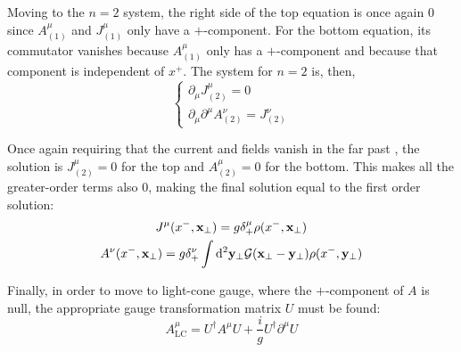 Moving to the $n=2$ system, the right side of the top equation is once again $0$ since $A_{(1)}^\mu$ and $J_{(1)}^{\mu}$ only have a $+$-component. For the bottom equation, its commutator vanishes because $A_{(1)}^\mu$ only has a $+$-component and because that component is independent of $x^+$. The system for $n=2$ is, then,
\begin{equation}
	\begin{cases}
	\partial_\mu J_{(2)}^\mu = 0  \\
	\partial_\mu \partial^\mu A_{(2)}^\nu = J_{(2)}^\nu
	\end{cases}
\end{equation}

Once again requiring that the current and fields vanish in the far past
, the solution is $J_{(2)}^\mu = 0$ for the top and $A_{(2)}^\mu =0$ for the bottom. This makes all the greater-order terms also $0$, making the final solution equal to the first order solution:
\begin{subequations}
\begin{gather}
	J^\mu(x^-,\mathbf{x}_\perp) = g \delta^{\mu}_+ \rho(x^-,\mathbf{x}_\perp) \\
	A^\nu(x^-,\mathbf{x}_\perp) =  g \delta^{\nu}_+  \int \mathop{}\!\mathrm{d}^2 \mathbf{y}_\perp \mathcal{G}(\mathbf{x_\perp} - \mathbf{y_\perp}) \rho(x^-,\mathbf{y}_\perp)
\end{gather}
\end{subequations}

Finally, in order to move to light-cone gauge, where the $+$-component of $A$ is null, the appropriate gauge transformation matrix $U$ must be found:
\begin{equation}
	A^\mu_\text{LC} = U^\dagger A^\mu U + \frac{i}{g} U^\dagger \partial^\mu U
\label{eq:gauge_transformation}
\end{equation}

